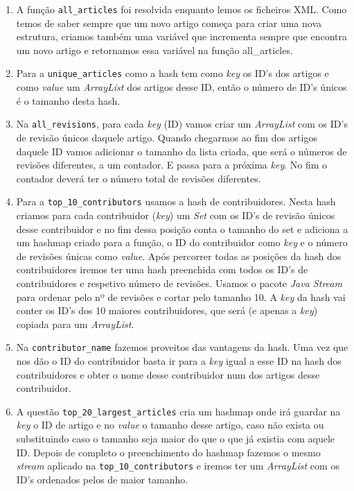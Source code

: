 \documentclass[a4paper,12pt]{report}
\begin{document}
\begin{enumerate}
	\setlength\itemsep{0.00001em}
	\item A função {\tt{}\selectfont all\_articles} foi resolvida enquanto lemos os ficheiros XML. Como temos de saber sempre que um novo artigo começa para criar uma nova estrutura, criamos também uma variável que incrementa sempre que encontra um novo artigo e retornamos essa variável na função {all\_articles}.
	
	\item Para a {\tt{}\selectfont unique\_articles} como a hash tem como {\sl key} os ID's dos artigos e como {\sl value} um {\sl ArrayList} dos artigos desse ID, então o número de ID's únicos é o tamanho desta hash.

	\item Na {\tt{}\selectfont all\_revisions}, para cada {\sl key} (ID) vamos criar um {\sl ArrayList} com os ID's de revisão únicos daquele artigo. Quando chegarmos ao fim dos artigos daquele ID vamos adicionar o tamanho da lista criada, que será o números de revisões diferentes, a um contador. E passa para a próxima {\sl key}. No fim o contador deverá ter o número total de revisões diferentes.
	
	\item Para a {\tt{}\selectfont top\_10\_contributors} usamos a hash de contribuidores. Nesta hash criamos para cada contribuidor ({\sl key}) um {\sl Set} com os ID's de revisão únicos desse contribuidor e no fim dessa posição conta o tamanho do set e adiciona a um hashmap criado para a função, o ID do contribuidor como {\sl key} e o número de revisões únicas como {\sl value}. Após percorrer todas as posições da hash dos contribuidores iremos ter uma hash preenchida com todos os ID's de contribuidores e respetivo número de revisões. Usamos o pacote {\sl Java Stream} para ordenar pelo nº de revisões e cortar pelo tamanho 10. A {\sl key} da hash vai conter os ID's dos 10 maiores contribuidores, que será (e apenas a {\sl key}) copiada para um {\sl ArrayList}.
	
	\item Na {\tt{}\selectfont contributor\_name} fazemos proveitos das vantagens da hash. Uma vez que nos dão o ID do contribuidor basta ir para a {\sl key} igual a esse ID na hash dos contribuidores e obter o nome desse contribuidor num dos artigos desse contribuidor.
	
	\item A questão {\tt{}\selectfont top\_20\_largest\_articles} cria um hashmap onde irá guardar na {\sl key} o ID de artigo e no {\sl value} o tamanho desse artigo, caso não exista ou substituindo caso o tamanho seja maior do que o que já existia com aquele ID. Depois de completo o preenchimento do hashmap fazemos o mesmo {\sl stream} aplicado na {\tt top\_10\_contributors} e iremos ter um {\sl ArrayList} com os ID's ordenados pelos de maior tamanho.
	

\end{enumerate}
\end{document}

